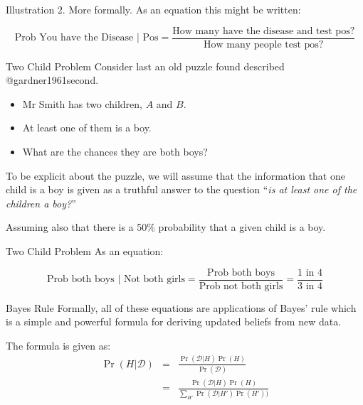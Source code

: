 \documentclass[
  11pt,
  ignorenonframetext,
]{beamer}
\providecommand{\tightlist}{%
  \setlength{\itemsep}{0pt}\setlength{\parskip}{0pt}}\usepackage{longtable,booktabs,array}
\begin{document}
\begin{frame}{Illustration 2. More formally.}
\protect\hypertarget{illustration-2.-more-formally.}{}
As an equation this might be written:

\[\text{Prob You have the Disease | Pos} = \frac{\text{How many have the disease and test pos?}}{\text{How many people test pos?}}\]
\end{frame}

\begin{frame}{Two Child Problem}
\protect\hypertarget{two-child-problem}{}
Consider last an old puzzle found described @gardner1961second.

\begin{itemize}
\tightlist
\item
  Mr Smith has two children, \(A\) and \(B\).
\item
  At least one of them is a boy.
\item
  What are the chances they are both boys?
\end{itemize}

To be explicit about the puzzle, we will assume that the information
that one child is a boy is given as a truthful answer to the question
``\emph{is at least one of the children a boy?}''

Assuming also that there is a 50\% probability that a given child is a
boy.
\end{frame}

\begin{frame}{Two Child Problem}
\protect\hypertarget{two-child-problem-1}{}
As an equation:

\[\text{Prob both boys | Not both girls} = \frac{\text{Prob both boys}}{\text{Prob not both girls}} = \frac{\text{1 in 4}}{\text{3 in 4}}\]
\end{frame}

\begin{frame}{Bayes Rule}
\protect\hypertarget{bayes-rule-1}{}
Formally, all of these equations are applications of Bayes' rule which
is a simple and powerful formula for deriving updated beliefs from new
data.

The formula is given as: \begin{eqnarray}
\Pr(H|\mathcal{D})&=&\frac{\Pr(\mathcal{D}|H)\Pr(H)}{\Pr(\mathcal{D})}\\
                  &=&\frac{\Pr(\mathcal{D}|H)\Pr(H)}{\sum_{H'}\Pr(\mathcal{D}|H')\Pr(H'))}
\end{eqnarray}
\end{frame}
\end{document}
